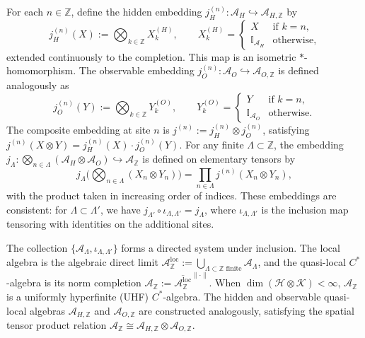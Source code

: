 \documentclass[12pt,a4paper]{article}
\begin{document}
For each $n \in \mathbb{Z}$, define the hidden embedding $j_H^{(n)}: \mathcal{A}_H \hookrightarrow \mathcal{A}_{H,\mathbb{Z}}$ by
\[
j_H^{(n)}(X) := \bigotimes_{k \in \mathbb{Z}} X_k^{(H)}, \qquad
X_k^{(H)} = \begin{cases}
X & \text{if } k = n,\\
\mathbb{I}_{\mathcal{A}_H} & \text{otherwise},
\end{cases}
\]
extended continuously to the completion. This map is an isometric $*$-homomorphism. The observable embedding $j_O^{(n)}: \mathcal{A}_O \hookrightarrow \mathcal{A}_{O,\mathbb{Z}}$ is defined analogously as
\[
j_O^{(n)}(Y) := \bigotimes_{k \in \mathbb{Z}} Y_k^{(O)}, \qquad
Y_k^{(O)} = \begin{cases}
Y & \text{if } k = n,\\
\mathbb{I}_{\mathcal{A}_O} & \text{otherwise}.
\end{cases}
\]
The composite embedding at site $n$ is $j^{(n)} := j_H^{(n)} \otimes j_O^{(n)}$, satisfying $j^{(n)}(X \otimes Y) = j_H^{(n)}(X) \cdot j_O^{(n)}(Y)$. For any finite $\Lambda \subset \mathbb{Z}$, the embedding $j_\Lambda: \bigotimes_{n \in \Lambda} (\mathcal{A}_H \otimes \mathcal{A}_O) \hookrightarrow \mathcal{A}_{\mathbb{Z}}$ is defined on elementary tensors by
\[
j_\Lambda\Big( \bigotimes_{n \in \Lambda} (X_n \otimes Y_n) \Big) = \prod_{n \in \Lambda} j^{(n)}(X_n \otimes Y_n),
\]
with the product taken in increasing order of indices. These embeddings are consistent: for $\Lambda \subset \Lambda'$, we have $j_{\Lambda'} \circ \iota_{\Lambda,\Lambda'} = j_\Lambda$, where $\iota_{\Lambda,\Lambda'}$ is the inclusion map tensoring with identities on the additional sites.

The collection $\{\mathcal{A}_\Lambda, \iota_{\Lambda,\Lambda'}\}$ forms a directed system under inclusion. The local algebra is the algebraic direct limit $\mathcal{A}_{\mathbb{Z}}^{\text{loc}} := \bigcup_{\Lambda \subset \mathbb{Z} \text{ finite}} \mathcal{A}_\Lambda$, and the quasi-local $C^*$-algebra is its norm completion $\mathcal{A}_{\mathbb{Z}} := \overline{\mathcal{A}_{\mathbb{Z}}^{\text{loc}}}^{\|\cdot\|}$. When $\dim(\mathcal{H} \otimes \mathcal{K}) < \infty$, $\mathcal{A}_{\mathbb{Z}}$ is a uniformly hyperfinite (UHF) $C^*$-algebra. The hidden and observable quasi-local algebras $\mathcal{A}_{H,\mathbb{Z}}$ and $\mathcal{A}_{O,\mathbb{Z}}$ are constructed analogously, satisfying the spatial tensor product relation $\mathcal{A}_{\mathbb{Z}} \cong \mathcal{A}_{H,\mathbb{Z}} \otimes \mathcal{A}_{O,\mathbb{Z}}$.
\end{document}
